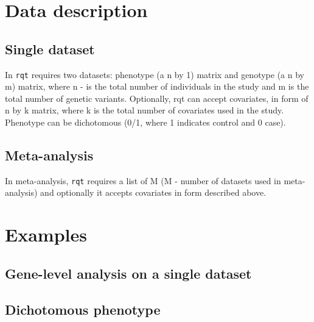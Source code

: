 \documentclass{article}
\begin{document}
\section{Data description}
\subsection{Single dataset}
In \texttt{rqt} requires two datasets: phenotype (a n by 1) matrix 
and genotype (a n by m) matrix, where n - is the total 
number of individuals in the study and m is the total number 
of genetic variants. Optionally, rqt can accept covariates, 
in form of n by k matrix, where k is the total number of 
covariates used in the study. Phenotype can be dichotomous 
(0/1, where 1 indicates control and 0 case).

\subsection{Meta-analysis}
In meta-analysis, \texttt{rqt} requires a list of M (M - number 
of datasets used in meta-analysis) and optionally it accepts
covariates in form described above.

\section{Examples}

\subsection{Gene-level analysis on a single dataset}
\subsection{Dichotomous phenotype}
\end{document}
